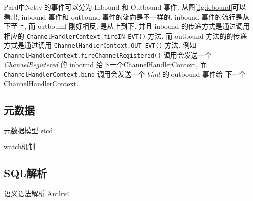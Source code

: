 \documentclass[a4paper, 12pt]{ctexart}
\begin{document}
Pard中Netty 的事件可以分为 Inbound 和 Outbound 事件.
从图\ref{fig:iobound}可以看出, inbound 事件和 outbound 事件的流向是不一样的, inbound 事件的流行是从下至上, 而 outbound 刚好相反, 是从上到下. 并且 inbound 的传递方式是通过调用相应的 \lstinline|ChannelHandlerContext.fireIN_EVT()| 方法, 而 outbound 方法的的传递方式是通过调用 \lstinline|ChannelHandlerContext.OUT_EVT()| 方法. 例如 \lstinline|ChannelHandlerContext.fireChannelRegistered()| 调用会发送一个 \textit{ChannelRegistered} 的 inbound 给下一个ChannelHandlerContext, 而 \lstinline|ChannelHandlerContext.bind| 调用会发送一个 \textit{bind} 的 outbound 事件给 下一个 ChannelHandlerContext.







\subsection{元数据}
元数据模型  etcd   


watch机制



\subsection{SQL解析}
语义语法解析
Antlrv4
\end{document}
